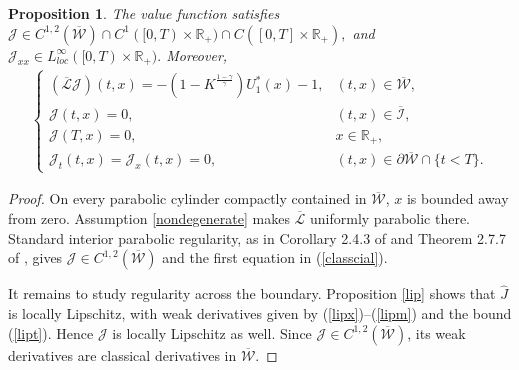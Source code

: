 \documentclass[a4paper,11pt]{amsart}
\numberwithin{equation}{section}
\newtheorem{pro}{Proposition}[section]
\begin{document}
{{\begin{pro}\label{regularity}
The value function satisfies $\mathcal J\in C^{1,2}(\overline{\mathcal W})\cap C^1([0,T)\times\mathbb R_+)\cap C([0,T]\times\mathbb R_+),$ and $
\mathcal J_{xx}\in L^\infty_{loc}([0,T)\times\mathbb R_+).
$
Moreover,
{\color{black}
\begin{align*}
\begin{cases}
(\overline{\mathcal L}\mathcal J)(t,x)=-(1-K^{\frac{1-\gamma}{\gamma}})U_1^\ast(x)-1, &(t,x)\in\overline{\mathcal W},\\
\mathcal J(t,x)=0, &(t,x)\in\overline{\mathcal I},\\
\mathcal J(T,x)=0, &x\in\mathbb R_+,\\
\mathcal J_t(t,x)=\mathcal J_x(t,x)=0, &(t,x)\in\partial\overline{\mathcal W}\cap\{t<T\}.
\end{cases}\tag{\theequation}\label{classcial}
\end{align*}
}
\end{pro}

\begin{proof}
On every parabolic cylinder compactly contained in $\overline{\mathcal W}$, {$x$ is bounded away from zero.} Assumption \ref{nondegenerate} makes $\overline{\mathcal L}$ uniformly parabolic there. Standard interior parabolic regularity, as in Corollary 2.4.3 of \citet{krylov2008lectures} and Theorem 2.7.7 of \citet{karatzas1998methods}, gives $\mathcal J\in C^{1,2}(\overline{\mathcal W})$ and the first equation in (\ref{classcial}).

{\color{black}
It remains to study regularity across the boundary. Proposition \ref{lip} shows that $\widehat J$ is locally Lipschitz, with weak derivatives given by (\ref{lipx})--(\ref{lipm}) and the bound (\ref{lipt}). Hence $\mathcal J$ is locally Lipschitz as well. Since $\mathcal J\in C^{1,2}(\overline{\mathcal W})$, its weak derivatives are classical derivatives in $\overline{\mathcal W}$. 

}
\end{proof}}}
\end{document}
